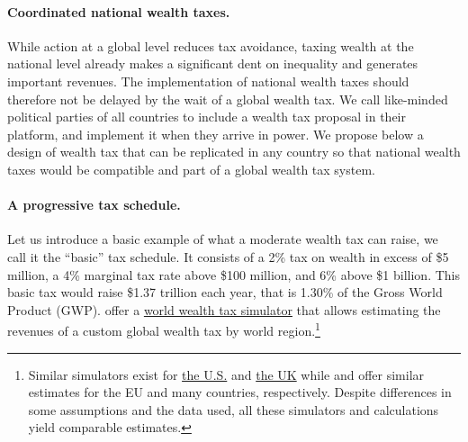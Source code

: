 \documentclass[12pt,english]{article}
\begin{document}
\paragraph{Coordinated national wealth taxes.} While action at a global level reduces tax avoidance, taxing wealth at the national level already makes a significant dent on inequality and generates important revenues. 
The implementation of national wealth taxes should therefore not be delayed by the wait of a global wealth tax. 
We call like-minded political parties of all countries to include a wealth tax proposal in their platform, and implement it when they arrive in power. We propose below a design of wealth tax that can be replicated in any country so that national wealth taxes would be compatible and part of a global wealth tax system. 

\paragraph{A progressive tax schedule.} %
Let us introduce a basic example of what a moderate wealth tax can raise, we call it the ``basic'' tax schedule. It consists of a 2\% tax on wealth in excess of \$5 million, a 4\% marginal tax rate above \$100 million, and 6\% above \$1 billion. This basic tax would raise \$1.37 trillion each year, that is 1.30\% of the Gross World Product (GWP). %
\citet{chancel_world_2022} offer a \href{https://wid.world/world-wealth-tax-simulator/}{world wealth tax simulator} that allows estimating the revenues of a custom global wealth tax by world region.\footnote{Similar simulators exist for \href{https://taxjusticenow.org/}{the U.S.} \citep{saez_triumph_2019} and \href{http://taxsimulator.ukwealth.tax/\#/appendix}{the UK} while \citet{kapeller_european_2021} and \citet{oxfam_taxing_2022} offer similar estimates for the EU and many countries, respectively. Despite differences in some assumptions and the data used, all these simulators and calculations yield comparable estimates.} 
\end{document}
